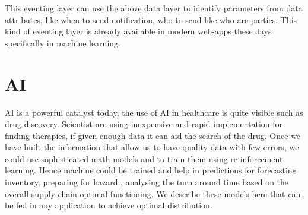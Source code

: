 \documentclass{article}
\begin{document}
This eventing layer can use the above data layer to identify parameters from data attributes, like when to send notification, who to send like who are parties. This kind of eventing layer is already available in modern web-apps these days specifically in machine learning.

\section{AI}
AI is a powerful catalyst today, the use of AI in healthcare is quite visible such as  drug discovery. Scientist are using inexpensive and rapid implementation for finding therapies, if given enough data it can aid the search of the drug\cite{keshavarzi2020artificial}. Once we have built the information that allow us to have quality data with few errors, we could use sophisticated math models and to train them using re-inforcement learning. Hence machine could be trained and  help in predictions for forecasting inventory, preparing for hazard , analysing the turn around time based on the overall supply chain optimal functioning. We describe these models here that can be fed in any application to achieve optimal distribution.
\end{document}
